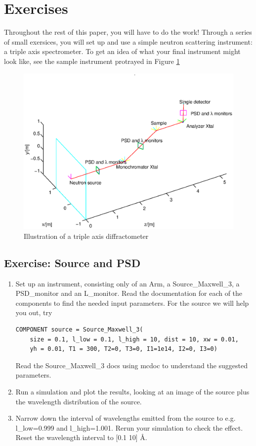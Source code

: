 \documentclass[a4paper]{article}
\begin{document}
\section{Exercises}
Throughout the rest of this paper, you will have to do the work!
Through a series of small exersices, you will set up and use a simple
neutron scattering instrument: a triple axis spectrometer. To get an idea of what your final
instrument might look like, see the sample instrument protrayed in Figure \ref{instr.eps}
\begin{figure}[htb!]
\begin{center}
\includegraphics[width=12cm]{pics/instr.eps}
\end{center}
\caption{Illustration of a triple axis diffractometer}
\label{instr.eps}
\end{figure}
\subsection{Exercise: Source and PSD}
\begin{enumerate}
\item{Set up an instrument, consisting only of an Arm, a Source\_Maxwell\_3,
a PSD\_monitor and an L\_monitor. Read the documentation for each of
the components to find the needed input parameters. For the source we
will help you out, try
\begin{verbatim}
COMPONENT source = Source_Maxwell_3(
    size = 0.1, l_low = 0.1, l_high = 10, dist = 10, xw = 0.01,
    yh = 0.01, T1 = 300, T2=0, T3=0, I1=1e14, I2=0, I3=0)
\end{verbatim}
Read the Source\_Maxwell\_3 docs using mcdoc to understand the
suggested parameters. }
\item{Run a simulation and plot the results, looking
at an image of the source plus the wavelength distribution of the
source. }
\item{Narrow down the interval of wavelengths emitted from the
source to e.g. l\_low=0.999 and l\_high=1.001. Rerun your simulation to
check the effect. Reset the wavelength interval to [0.1 10] \AA.}
\end{enumerate}
\end{document}
